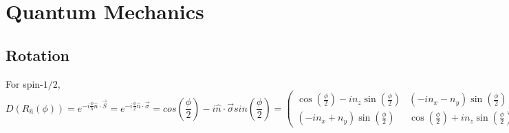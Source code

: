 \chapter{Quantum Mechanics}

\section{Rotation}
For spin-$1/2$, 
\[ 
D(R_{\hat{n}}(\phi)) = e^{-i\frac{\phi}{\hbar}\hat{n}\cdot\vec{S}} = e^{-i\frac{\phi}{2}\hat{n}\cdot\vec{\sigma}} = 
cos(\frac{\phi}{2}) - i \hat{n} \cdot \vec{\sigma} sin(\frac{\phi}{2}) = 
\begin{pmatrix}
    \cos(\frac{\phi}{2}) - in_{z}\sin(\frac{\phi}{2}) & (-i n_{x} - n_{y})\sin(\frac{\phi}{2}) \\ 
    (-i n_{x} + n_{y})\sin(\frac{\phi}{2}) &  \cos(\frac{\phi}{2}) + in_{z}\sin(\frac{\phi}{2})  
\end{pmatrix}
\]
